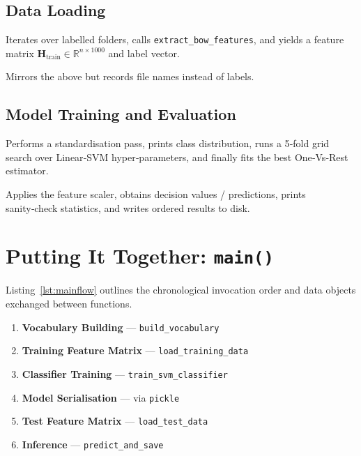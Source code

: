 \documentclass[10pt,twocolumn,letterpaper]{article}
\begin{document}
\subsection{Data Loading}
\begin{description}[leftmargin=*]
  \item[\texttt{load\_training\_data()}] Iterates over labelled folders, calls \texttt{extract\_bow\_features}, and yields a feature matrix $\mathbf{H}_{\text{train}} \in \mathbb{R}^{n\times1000}$ and label vector.
  \item[\texttt{load\_test\_data()}] Mirrors the above but records file names instead of labels.
\end{description}

\subsection{Model Training and Evaluation}
\begin{description}[leftmargin=*]
  \item[\texttt{train\_svm\_classifier()}] Performs a standardisation pass, prints class distribution, runs a 5‑fold grid search over Linear‑SVM hyper‑parameters, and finally fits the best One‑Vs‑Rest estimator.
  \item[\texttt{predict\_and\_save()}] Applies the feature scaler, obtains decision values / predictions, prints sanity‑check statistics, and writes ordered results to disk.
\end{description}

\section{Putting It Together: \texttt{main()}}
Listing~\ref{lst:mainflow} outlines the chronological invocation order and data objects exchanged between functions.

\begin{enumerate}[leftmargin=*]
  \item \textbf{Vocabulary Building} — \texttt{build\_vocabulary}
  \item \textbf{Training Feature Matrix} — \texttt{load\_training\_data}
  \item \textbf{Classifier Training} — \texttt{train\_svm\_classifier}
  \item \textbf{Model Serialisation} — via \texttt{pickle}
  \item \textbf{Test Feature Matrix} — \texttt{load\_test\_data}
  \item \textbf{Inference} — \texttt{predict\_and\_save}
\end{enumerate}
\end{document}
